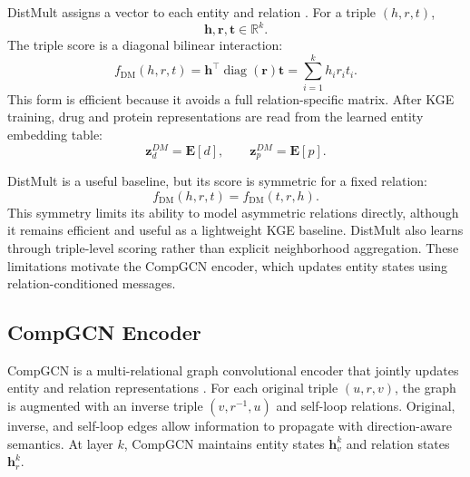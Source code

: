 DistMult assigns a vector to each entity and relation \cite{YangYHGD14a}. For a triple $(h,r,t)$,
\begin{equation}
    \mathbf{h},\mathbf{r},\mathbf{t}
    \in
    \mathbb{R}^{k}.
\end{equation}
The triple score is a diagonal bilinear interaction:
\begin{equation}
    f_{\mathrm{DM}}(h,r,t)
    =
    \mathbf{h}^{\top}
    \operatorname{diag}(\mathbf{r})
    \mathbf{t}
    =
    \sum_{i=1}^{k}h_i r_i t_i.
    \label{eq:distmult_score}
\end{equation}
This form is efficient because it avoids a full relation-specific matrix. After KGE training, drug and protein representations are read from the learned entity embedding table:
\begin{equation}
    \mathbf{z}_{d}^{DM}=\mathbf{E}[d],
    \qquad
    \mathbf{z}_{p}^{DM}=\mathbf{E}[p].
\end{equation}

DistMult is a useful baseline, but its score is symmetric for a fixed relation:
\begin{equation}
    f_{\mathrm{DM}}(h,r,t)
    =
    f_{\mathrm{DM}}(t,r,h).
\end{equation}
This symmetry limits its ability to model asymmetric relations directly, although it remains efficient and useful as a lightweight KGE baseline. DistMult also learns through triple-level scoring rather than explicit neighborhood aggregation. These limitations motivate the CompGCN encoder, which updates entity states using relation-conditioned messages.

\subsection{CompGCN Encoder}

CompGCN is a multi-relational graph convolutional encoder that jointly updates entity and relation representations \cite{VashishthSNT20}. For each original triple $(u,r,v)$, the graph is augmented with an inverse triple $(v,r^{-1},u)$ and self-loop relations. Original, inverse, and self-loop edges allow information to propagate with direction-aware semantics. At layer $k$, CompGCN maintains entity states $\mathbf{h}_{v}^{k}$ and relation states $\mathbf{h}_{r}^{k}$.

